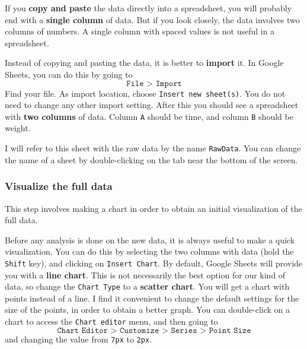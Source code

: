 If you \textbf{copy and paste} the data directly into a spreadsheet, you will probably end with a \textbf{single column} of data. But if you look closely, the data involves two columns of numbers. A single column with spaced values is not useful in a spreadsheet.

Instead of copying and pasting the data, it is better to \textbf{import} it. In Google Sheets, you can do this by going to
\begin{equation}
    \texttt{File > Import}
\end{equation}
Find your file. As import location, choose \texttt{Insert new sheet(s)}. You do not need to change any other import setting. After this you should see a spreadsheet with \textbf{two columns} of data. Column \texttt{A} should be time, and column \texttt{B} should be weight.

I will refer to this sheet with the raw data by the name \texttt{RawData}. You can change the name of a sheet by double-clicking on the tab near the bottom of the screen.
\subsubsection{Visualize the full data}
This step involves making a chart in order to obtain an initial visualization of the full data.

Before any analysis is done on the new data, it is always useful to make a quick visualization. You can do this by selecting the two columns with data (hold the \texttt{Shift} key), and clicking on \texttt{Insert Chart}. By default, Google Sheets will provide you with a \textbf{line chart}. This is not necessarily the best option for our kind of data, so change the \texttt{Chart Type} to a \textbf{scatter chart}. You will get a chart with points instead of a line. I find it convenient to change the default settings for the size of the points, in order to obtain a better graph. You can double-click on a chart to access the \texttt{Chart editor} menu, and then going to
\begin{equation}
    \texttt{Chart Editor > Customize > Series > Point Size}
\end{equation}
and changing the value from \texttt{7px} to \texttt{2px}.

